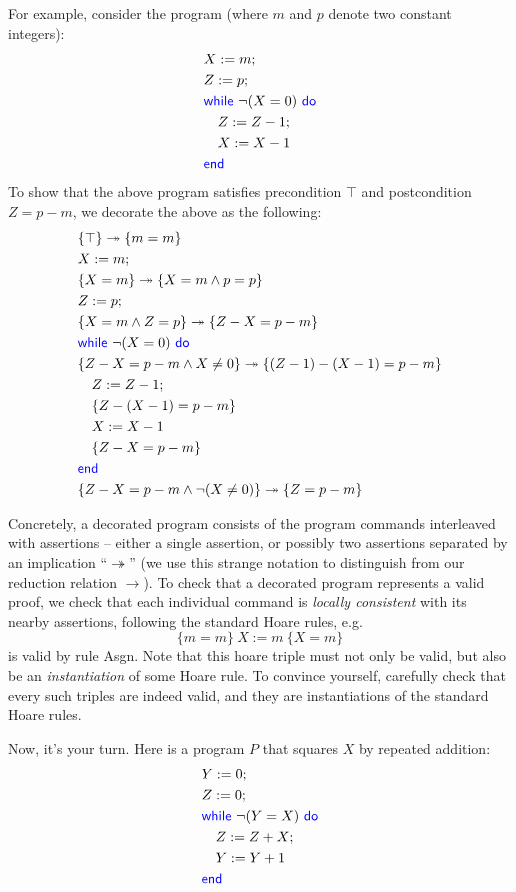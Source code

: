 \documentclass[11pt,a4paper]{article}
\newcommand{\kword}[1]{{\color{blue} \textsf{#1}}}
\newcommand{\While}{\kword{while}}
\newcommand{\Do}{\kword{do}}
\newcommand{\End}{\kword{end}}
\let\implies\twoheadrightarrow
\begin{document}
For example, consider the program (where $m$ and $p$ denote two constant integers):
\begin{align*}
    & X := m; \\
    & Z := p; \\
    & \While~\lnot(X = 0)~\Do \\
    &\quad Z := Z - 1; \\
    &\quad X := X - 1 \\
    &\End
\end{align*}
To show that the above program satisfies precondition $\top$ and postcondition $Z = p - m$,
we decorate the above as the following:
\begin{align*}
    & \{\top\} \implies \{m=m\} \\
    & X := m; \\
    & \{X=m\} \implies \{X = m \land p = p\} \\
    & Z := p; \\
    & \{X = m \land Z = p \} \implies \{Z - X = p - m\} \\
    & \While~\lnot(X = 0)~\Do \\
    & \{Z - X = p - m \land X \not= 0\} \implies \{(Z - 1) - (X - 1) = p - m\} \\
    &\quad Z := Z - 1; \\
    &\quad \{Z - (X - 1) = p - m\} \\
    &\quad X := X - 1 \\
    &\quad \{Z - X = p - m\} \\
    &\End \\
    &\{Z - X = p - m \land \lnot(X \not= 0)\} \implies \{Z = p - m\}
\end{align*}

Concretely, a decorated program consists of the program commands interleaved with assertions --
either a single assertion, or possibly two assertions separated by an implication ``$\implies$''
(we use this strange notation to distinguish from our reduction relation $\to$).
To check that a decorated program represents a valid proof,
we check that each individual command is \emph{locally consistent} with its nearby assertions,
following the standard Hoare rules, e.g. $$\{m=m\}~X := m~\{X=m\}$$ is valid by rule Asgn.
Note that this hoare triple must not only be valid, but also be an \emph{instantiation} of some Hoare rule.
To convince yourself, carefully check that every such triples are indeed valid, and they are instantiations of
the standard Hoare rules.

Now, it's your turn. Here is a program $P$ that squares $X$ by repeated addition:
\begin{align*}
& Y := 0; \\
& Z := 0; \\
& \While~\lnot(Y = X)~\Do \\
&\quad Z := Z + X; \\
&\quad Y := Y + 1 \\
& \End
\end{align*}
\end{document}
